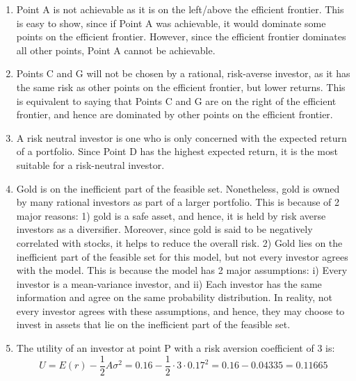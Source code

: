 \documentclass[a4paper]{article}
\begin{document}
\begin{enumerate}[label=(\alph*)]
    \item Point A is not achievable as it is on the left/above the efficient frontier. This is easy to show, since if Point A was achievable, it would dominate some points on the efficient frontier. However, since the efficient frontier dominates all other points, Point A cannot be achievable. \\
    
    \item Points C and G will not be chosen by a rational, risk-averse investor, as it has the same risk as other points on the efficient frontier, but lower returns. This is equivalent to saying that Points C and G are on the right of the efficient frontier, and hence are dominated by other points on the efficient frontier. \\
    
    \item A risk neutral investor is one who is only concerned with the expected return of a portfolio. Since Point D has the highest expected return, it is the most suitable for a risk-neutral investor. \\

    \item Gold is on the inefficient part of the feasible set. Nonetheless, gold is owned by many rational investors as part of a larger portfolio. This is because of 2 major reasons: 1) gold is a safe asset, and hence, it is held by risk averse investors as a diversifier. Moreover, since gold is said to be negatively correlated with stocks, it helps to reduce the overall risk. 2) Gold lies on the inefficient part of the feasible set for this model, but not every investor agrees with the model. This is because the model has 2 major assumptions: i) Every investor is a mean-variance investor, and ii) Each investor has the same information and agree on the same probability distribution. In reality, not every investor agrees with these assumptions, and hence, they may choose to invest in assets that lie on the inefficient part of the feasible set. \\

    \item The utility of an investor at point P with a risk aversion coefficient of 3 is:
    \[
        U = E(r) - \frac{1}{2} A \sigma^2 = 0.16 - \frac{1}{2} \cdot 3 \cdot 0.17^2 = 0.16 - 0.04335 = 0.11665
    \]
\end{enumerate}
\end{document}
